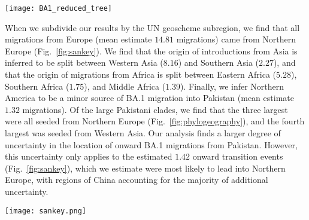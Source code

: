 \begin{figure*}[ht]
   \centering
   \texttt{[image: BA1\_reduced\_tree]}
    \caption[Pakistan Bayesian phylogeography results]{Results of our Bayesian phylogeographic analysis. (A) time-calibrated, reduced maximum clade credibility phylogenetic tree where all taxa from non-Pakistan (or travel history) locations have been hidden. Branches along the tree remain colored by the inferred region of the ancestral strain. Three large Pakistani clades cumulatively representing roughly half of the Pakistani sequences considered in this analysis. (B) distribution of importations to Pakistan by region. (C) Distribution over time of the inferred number of weekly importations to Pakistan, divided by inferred source. (D) individual Pakistani clade count distribution in the MCC tree; most clades are inferred as singletons, representing roughly half of the sequences in the tree.}
    \label{fig:phylogeography}
\end{figure*}

When we subdivide our results by the UN geoscheme subregion, we find that all migrations from Europe (mean estimate $14.81$ migrations) came from Northern Europe (Fig.~\ref{fig:sankey}).
We find that the origin of introductions from Asia is inferred to be split between Western Asia ($8.16$) and Southern Asia ($2.27$), and that the origin of migrations from Africa is split between Eastern Africa ($5.28$), Southern Africa ($1.75$), and Middle Africa ($1.39$).
Finally, we infer Northern America to be a minor source of BA.1 migration into Pakistan (mean estimate $1.32$ migrations).
Of the large Pakistani clades, we find that the three largest were all seeded from Northern Europe (Fig.~\ref{fig:phylogeography}), and the fourth largest was seeded from Western Asia.
Our analysis finds a larger degree of uncertainty in the location of onward BA.1 migrations from Pakistan. However, this uncertainty only applies to the estimated $1.42$ onward transition events (Fig.~\ref{fig:sankey}), which we estimate were most likely to lead into Northern Europe, with regions of China accounting for the majority of additional uncertainty.

\begin{figure*}[ht]
   \centering
   \texttt{[image: sankey.png]}
    \caption[BA.1 migration history by location]{Sankey diagram illustrating inferred BA.1 migrations into (mean estimate $35.12$ migrations) and out of (mean estimate $1.42$ migrations) Pakistan. Northern Europe is the source of all inferred migrations to Pakistan from Europe, representing a plurality of importations from both a region and sub-region geographic resolutions.}
    \label{fig:sankey}
\end{figure*}

